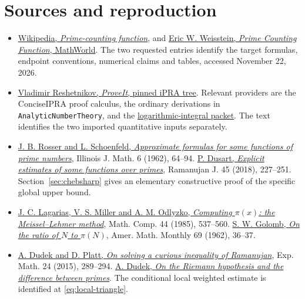 \section*{Sources and reproduction}
\begin{itemize}
\item \href{https://en.wikipedia.org/wiki/Prime-counting_function}{Wikipedia, \emph{Prime-counting function}}, and \href{https://mathworld.wolfram.com/PrimeCountingFunction.html}{Eric W. Weisstein, \emph{Prime Counting Function}, MathWorld}. The two requested entries identify the target formulas, endpoint conventions, numerical claims and tables, accessed November 22, 2026.
\item \href{https://github.com/VladimirReshetnikov/ProveIt/tree/a9c0f1949be61679ed2e219b97dc42ecb7ae91a9/Logic/PrimitiveRecursiveArithmetic}{Vladimir Reshetnikov, \emph{ProveIt}, pinned iPRA tree}. Relevant providers are the ConciseIPRA proof calculus, the ordinary derivations in \texttt{AnalyticNumberTheory}, and the \href{https://github.com/VladimirReshetnikov/ProveIt/tree/a9c0f1949be61679ed2e219b97dc42ecb7ae91a9/Logic/PrimitiveRecursiveArithmetic/docs/proofs/analytic-number-theory/pnt_li_ipra_2026-11-15}{logarithmic-integral packet}. The text identifies the two imported quantitative inputs separately.
\item \href{https://doi.org/10.1215/ijm/1255631807}{J. B. Rosser and L. Schoenfeld, \emph{Approximate formulas for some functions of prime numbers}}, Illinois J. Math. 6 (1962), 64--94. \href{https://doi.org/10.1007/s11139-016-9839-4}{P. Dusart, \emph{Explicit estimates of some functions over primes}}, Ramanujan J. 45 (2018), 227--251. Section~\ref{sec:chebsharp} gives an elementary constructive proof of the specific global upper bound.
\item \href{https://www-users.cse.umn.edu/~odlyzko/doc/arch/meissel.lehmer.pdf}{J. C. Lagarias, V. S. Miller and A. M. Odlyzko, \emph{Computing $\pi(x)$: the Meissel--Lehmer method}}, Math. Comp. 44 (1985), 537--560. \href{https://www.jstor.org/stable/2312732}{S. W. Golomb, \emph{On the ratio of $N$ to $\pi(N)$}}, Amer. Math. Monthly 69 (1962), 36--37.
\item \href{https://arxiv.org/abs/1407.1901}{A. Dudek and D. Platt, \emph{On solving a curious inequality of Ramanujan}}, Exp. Math. 24 (2015), 289--294. \href{https://arxiv.org/abs/1402.6417}{A. Dudek, \emph{On the Riemann hypothesis and the difference between primes}}. The conditional local weighted estimate is identified at \eqref{eq:local-triangle}.
\end{itemize}
